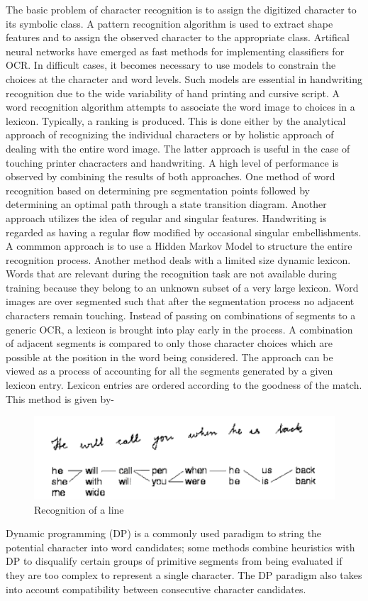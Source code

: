 \documentclass[main.tex]{subfiles}
\begin{document}
The basic problem of character recognition is to assign the digitized character
to its symbolic class. A pattern recognition algorithm is used to extract
shape features and to assign the observed character to the appropriate class.
Artifical neural networks have emerged as fast methods for implementing
classifiers for OCR. In difficult cases, it becomes necessary to use models to
constrain the choices at the character and word levels. Such models are
essential in handwriting recognition due to the wide variability of hand
printing and cursive script. A word recognition algorithm attempts to associate
the word image to choices in a lexicon. Typically, a ranking is produced. This
is done either by the analytical approach of recognizing the individual
characters or by holistic approach of dealing with the entire word image. The
latter approach is useful in the case of touching printer chacracters and
handwriting. A high level of performance is observed by combining the results of
both approaches. One method of word recognition based on determining pre
segmentation points followed by determining an optimal path through a state
transition diagram. Another approach utilizes the idea of regular and singular
features. Handwriting is regarded as having a regular flow modified by
occasional singular embellishments. A commmon approach is to use a Hidden Markov
Model to structure the entire recognition process. Another method deals with a
limited size dynamic lexicon. Words that are relevant during the recognition
task are not available during training because they belong to an unknown subset
of a very large lexicon. Word images are over segmented such that after the
segmentation process no adjacent characters remain touching. Instead of passing
on combinations of segments to a generic OCR, a lexicon is brought into play
early in the process. A combination of adjacent segments is compared to only
those character choices which are possible at the position in the word being
considered. The approach can be viewed as a process of accounting for all the
segments generated by a given lexicon entry. Lexicon entries are ordered
according to the goodness of the match. This method is given by-
\begin{figure}[H]
	\includegraphics[width=\linewidth]{figures/figure-4.png}
	\caption{Recognition of a line}
	\label{fig4}
\end{figure}
Dynamic programming (DP) is a commonly used paradigm to string the potential
character into word candidates; some methods combine heuristics with DP to
disqualify certain groups of primitive segments from being evaluated if they are
too complex to represent a single character. The DP paradigm also takes into
account compatibility between consecutive character candidates.
\end{document}
